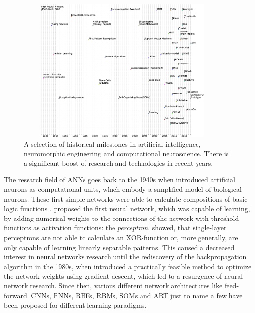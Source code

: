 \begin{figure}[t!]
	\centering
	\includegraphics[width=0.95\textwidth,height=270px]{imgs/neuromorphic_timeline.eps}
	\caption{A selection of historical milestones in artificial intelligence, neuromorphic engineering and computational neuroscience. There is a significant boost of research and technologies in recent years.}
	\label{fig:neuro_time}
\end{figure}
The research field of \aclp{ANN} goes back to the 1940s when \textcite{McCulloch1943} introduced artificial neurons as computational units, which embody a simplified model of biological neurons.
These first simple networks were able to calculate compositions of basic logic functions \parencite{McCulloch1943, Rojas1996}.
\textcite{Rosenblatt58} proposed the first neural network, which was capable of learning, by adding numerical weights to the connections of the network with threshold functions as activation functions: the \textit{perceptron}.
\textcite{Minsky1969} showed, that single-layer perceptrons are not able to calculate an XOR-function or, more generally, are only capable of learning linearly separable patterns.
This caused a decreased interest in neural networks research until the rediscovery of the backpropagation algorithm \parencite{Werbos1974} in the 1980s, when \textcite{Rumelhart1986} introduced a practically feasible method to optimize the network weights using gradient descent, which led to a resurgence of neural network research.
Since then, various different network architectures like feed-forward, \acp{CNN}, \acp{RNN}, \acp{RBF}, \acp{RBM}, \acp{SOM} and \ac{ART} just to name a few \parencite{Schmidhuber2015} have been proposed for different learning paradigms.
